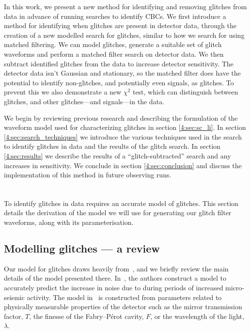 In this work, we present a new method for identifying and removing \scladj glitches from \gwadj data in advance of running searches to identify CBCs.
We first introduce a method for identifying when \scladj glitches are present in detector data, through the creation of a new modelled search for \scladj glitches, similar to how we search for \gws using matched filtering. We can model \scladj glitches, generate a suitable set of glitch waveforms and perform a matched filter search on detector data. We then subtract identified glitches from the data to increase detector sensitivity. The detector data isn't Gaussian and stationary, so the matched filter does have the potential to identify non-\scladj glitches, and potentially even \gwadj signals, as \scladj glitches. To prevent this we also demonstrate a new \scl $\chi^{2}$ test, which can distinguish between \scladj glitches, and other glitches---and \gwadj signals---in the data.

We begin by reviewing previous research and describing the formulation of the waveform model used for characterizing \scladj glitches in section \ref{4:sec:sc_li}. In section \ref{4:sec:search_techniques} we introduce the various techniques used in the search to identify \scladj glitches in \gwadj data and the results of the \scladj glitch search. In section \ref{4:sec:results} we describe the results of a ``glitch-subtracted'' \gwadj search and any increases in sensitivity. We conclude in section \ref{4:sec:conclusion} and discuss the implementation of this method in future observing runs.

\section{\label{4:sec:sc_li}\Scl}

To identify \scladj glitches in \gwadj data requires an accurate model of \scladj glitches. This section details the derivation of the model we will use for generating our \scladj glitch filter waveforms, along with its parameterisation.

\subsection{Modelling \scladj glitches — a review}

Our model for \scladj glitches draws heavily from~\cite{TAccadia:2010}, and we briefly review the main details of the model presented there. In~\cite{TAccadia:2010}, the authors construct a model to accurately predict the increase in noise due to \scl during periods of increased micro-seismic activity. The model in~\cite{TAccadia:2010} is constructed from parameters related to physically measurable properties of the detector such as the mirror transmission factor, $T$, the finesse of the Fabry–Pérot cavity, $F$, or the wavelength of the light, $\lambda$.

